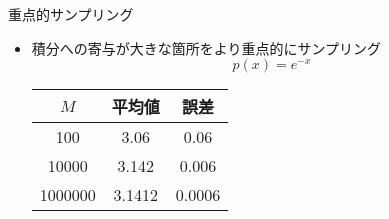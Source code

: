 \begin{frame}[t,fragile]{重点的サンプリング}
  \begin{itemize}
    \setlength{\itemsep}{1em}
  \item 積分への寄与が大きな箇所をより重点的にサンプリング
    \[
    p(x) = e^{-x}
    \]
    \begin{tabular}{|c|c|c|}
      \hline
      $M$ & 平均値 & 誤差 \\
      \hline
      100 & 3.06 & 0.06 \\
      10000 & 3.142 & 0.006 \\
      1000000 & 3.1412 & 0.0006 \\
      \hline
    \end{tabular}
  \end{itemize}
  \vspace*{-7em}
  \hspace*{17em}
\end{frame}
